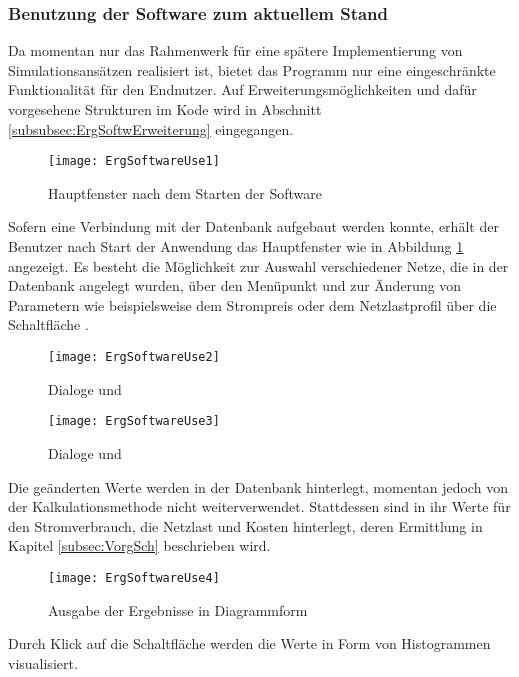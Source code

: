 \subsubsection{Benutzung der Software zum aktuellem Stand}
Da momentan nur das Rahmenwerk für eine spätere Implementierung von Simulationsansätzen realisiert ist, bietet das Programm nur eine eingeschränkte Funktionalität für den Endnutzer. Auf Erweiterungsmöglichkeiten und dafür vorgesehene Strukturen im Kode wird in Abschnitt \ref{subsubsec:ErgSoftwErweiterung} eingegangen.
\begin{figure}[ht]
	\centering
	\texttt{[image: ErgSoftwareUse1]}
	\caption{Hauptfenster nach dem Starten der Software}
	\label{fig:ErgSoftwareUse1}
\end{figure}
Sofern eine Verbindung mit der Datenbank aufgebaut werden konnte, erhält der Benutzer nach Start der Anwendung das Hauptfenster wie in Abbildung \ref{fig:ErgSoftwareUse1} angezeigt. Es besteht die Möglichkeit zur Auswahl verschiedener Netze, die in der Datenbank angelegt wurden, über den Menüpunkt  und zur Änderung von Parametern wie beispielsweise dem Strompreis oder dem Netzlastprofil über die Schaltfläche .
\begin{figure}[ht]
	\centering
	\texttt{[image: ErgSoftwareUse2]}
	\caption{Dialoge  und }
	\label{fig:ErgSoftwareUse2}
\end{figure}
\begin{figure}[ht]
	\centering
	\texttt{[image: ErgSoftwareUse3]}
	\caption{Dialoge  und }
	\label{fig:ErgSoftwareUse3}
\end{figure}
Die geänderten Werte werden in der Datenbank hinterlegt, momentan jedoch von der Kalkulationsmethode nicht weiterverwendet. Stattdessen sind in ihr Werte für den Stromverbrauch, die Netzlast und Kosten hinterlegt, deren Ermittlung in Kapitel \ref{subsec:VorgSch} beschrieben wird.
\begin{figure}[ht]
	\centering
	\texttt{[image: ErgSoftwareUse4]}
	\caption{Ausgabe der Ergebnisse in Diagrammform}
	\label{fig:ErgSoftwareUse4}
\end{figure}
Durch Klick auf die Schaltfläche  werden die Werte in Form von Histogrammen visualisiert.

